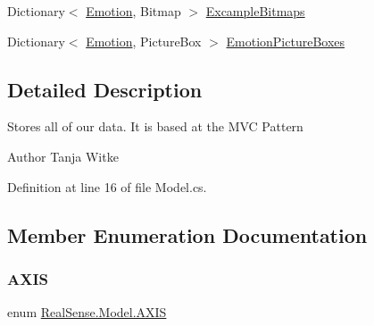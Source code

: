 \begin{DoxyCompactItemize}
\item 
Dictionary$<$ \hyperlink{class_real_sense_1_1_model_a5bf3fde8f53519f7a740d8b4e0399208}{Emotion}, Bitmap $>$ \hyperlink{class_real_sense_1_1_model_afbdadf185ba37319705fd55d102c0cb4}{Excample\+Bitmaps}
\item 
Dictionary$<$ \hyperlink{class_real_sense_1_1_model_a5bf3fde8f53519f7a740d8b4e0399208}{Emotion}, Picture\+Box $>$ \hyperlink{class_real_sense_1_1_model_ad2c87f308e42010ca032deec5cfa5e0b}{Emotion\+Picture\+Boxes}
\end{DoxyCompactItemize}


\subsection{Detailed Description}
Stores all of our data. It is based at the M\+VC Pattern

\begin{DoxyAuthor}{Author}
Tanja Witke 
\end{DoxyAuthor}


Definition at line 16 of file Model.\+cs.



\subsection{Member Enumeration Documentation}
\mbox{\label{class_real_sense_1_1_model_ab1d8b9992dae2162c48b52f6694f946b}} 
\subsubsection{\texorpdfstring{A\+X\+IS}{AXIS}}
{\footnotesize\ttfamily enum \hyperlink{class_real_sense_1_1_model_ab1d8b9992dae2162c48b52f6694f946b}{Real\+Sense.\+Model.\+A\+X\+IS}\hspace{0.3cm}{\ttfamily [strong]}}

